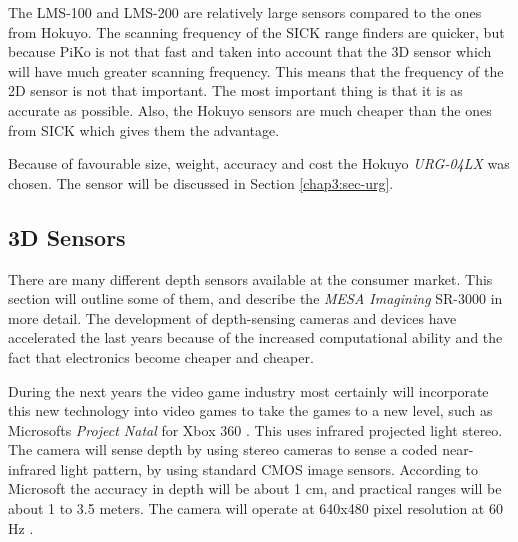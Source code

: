 The LMS-100 and LMS-200 are relatively large sensors compared to the ones from Hokuyo. The
scanning frequency of the SICK range finders are quicker, but because PiKo is not that
fast and taken into account that the 3D sensor which will have much greater scanning
frequency. This means that the frequency of the 2D sensor is not that important. The most
important thing is that it is as accurate as possible. Also, the Hokuyo sensors are much
cheaper than the ones from SICK which gives them the advantage.

Because of favourable size, weight, accuracy and cost the Hokuyo \emph{URG-04LX} was
chosen. The sensor will be discussed in Section \ref{chap3:sec-urg}.

\subsection{3D Sensors}
There are many different depth sensors available at the consumer market. This section will
outline some of them, and describe the \emph{MESA Imagining} SR-3000 in more detail.
The development of depth-sensing cameras and devices have accelerated the last years
because of the increased computational ability and the fact that electronics become
cheaper and cheaper. \cite{low-cost-depthcameras}

During the next years the video game industry most certainly will
incorporate this new technology into video games to take the games to a new level, such as
Microsofts \emph{Project Natal} for Xbox 360 \cite{project-natal}. This uses infrared
projected light stereo. The camera will sense depth by using stereo cameras to sense a
coded near-infrared light pattern, by using standard CMOS image sensors. According to
Microsoft the accuracy in depth will be about 1 cm, and practical ranges will be about
1 to 3.5 meters. The camera will operate at 640x480 pixel resolution at 60 Hz
\cite{conceivably-tech}.



